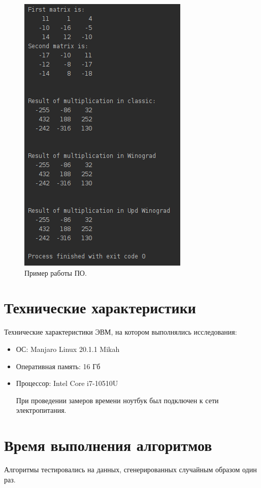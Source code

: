 \documentclass[12pt]{report}
\begin{document}
\begin{figure}
\begin{center}
\includegraphics[scale=1]{inc/img/randExample.png}
\captionsetup{justification=centering}
	\caption{Пример работы ПО.}
	\label{img:example}	
\end{center}
\end{figure}

\newpage

\section{Технические характеристики}
Технические характеристики ЭВМ, на котором выполнялись исследования:
\begin{itemize}
\item ОС: Manjaro Linux 20.1.1 Mikah
\item Оперативная память: 16 Гб
\item Процессор: Intel Core i7-10510U

При проведении замеров времени ноутбук был подключен к сети электропитания.
\end{itemize}

\section{Время выполнения алгоритмов}
Алгоритмы тестировались на данных, сгенерированных случайным образом один раз.
\end{document}
